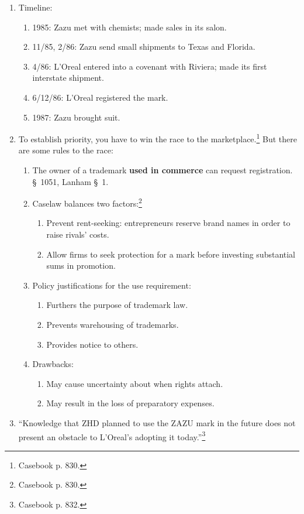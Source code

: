 \begin{enumerate}
    \item Timeline:
    \begin{enumerate}
        \item 1985: Zazu met with chemists; made sales in its salon.
        \item 11/85, 2/86: Zazu send small shipments to Texas and Florida. 
        \item 4/86: L'Oreal entered into a covenant with Riviera; made its 
        first interstate shipment.
        \item 6/12/86: L'Oreal registered the mark.
        \item 1987: Zazu brought suit.
    \end{enumerate}
    \item To establish priority, you have to win the race to the 
    marketplace.\footnote{Casebook p. 830.} But there are some rules to the 
    race:
    \begin{enumerate}
        \item The owner of a trademark \textbf{used in commerce} can request 
        registration. \S\ 1051, Lanham \S\ 1.
        \item Caselaw balances two factors:\footnote{Casebook p. 830.}
        \begin{enumerate}
            \item Prevent rent-seeking: entrepreneurs reserve brand names in 
            order to raise rivals' costs.
            \item Allow firms to seek protection for a mark before investing 
            substantial sums in promotion.
        \end{enumerate}
        \item Policy justifications for the use requirement:
        \begin{enumerate}
            \item Furthers the purpose of trademark law.
            \item Prevents warehousing of trademarks.
            \item Provides notice to others.
        \end{enumerate}
        \item Drawbacks:
        \begin{enumerate}
            \item May cause uncertainty about when rights attach.
            \item May result in the loss of preparatory expenses.
        \end{enumerate}
    \end{enumerate}
    \item ``Knowledge that ZHD planned to use the ZAZU mark in the future does 
    not present an obstacle to L'Oreal's adopting it 
    today.''\footnote{Casebook p. 832.}
\end{enumerate}

